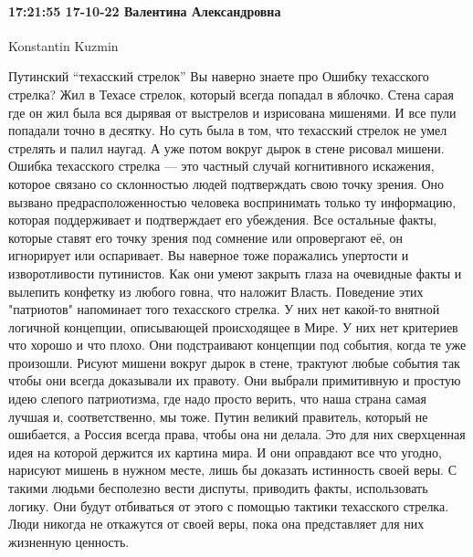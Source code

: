  
 
 
 
 

\paragraph{17:21:55 17-10-22 Валентина Александровна}

Konstantin Kuzmin

Путинский “техасский стрелок”
Вы наверно знаете про Ошибку техасского стрелка?
Жил в Техасе стрелок, который всегда попадал в яблочко. Стена сарая где он жил была вся дырявая от выстрелов и изрисована мишенями. И все пули попадали точно в десятку. Но суть была в том, что техасский стрелок не умел стрелять и палил наугад. А уже потом вокруг дырок в стене рисовал мишени.
Ошибка техасского стрелка — это частный случай когнитивного искажения, которое связано со склонностью людей подтверждать свою точку зрения. Оно вызвано предрасположенностью человека воспринимать только ту информацию, которая поддерживает и подтверждает его убеждения. Все остальные факты, которые ставят его точку зрения под сомнение или опровергают её, он игнорирует или оспаривает.
Вы наверное тоже поражались упертости и изворотливости путинистов. Как они умеют закрыть глаза на очевидные факты и вылепить конфетку из любого говна, что наложит Власть.
Поведение этих "патриотов" напоминает того техасского стрелка. У них нет какой-то внятной логичной концепции, описывающей происходящее в Мире. У них нет критериев что хорошо и что плохо. Они подстраивают концепции под события, когда те уже произошли. Рисуют мишени вокруг дырок в стене, трактуют любые события так чтобы они всегда доказывали их правоту.
Они выбрали примитивную и простую идею слепого патриотизма, где надо просто верить, что наша страна самая лучшая и, соответственно, мы тоже. Путин великий правитель, который не ошибается, а Россия всегда права, чтобы она ни делала. Это для них сверхценная идея на которой держится их картина мира. И они оправдают все что угодно, нарисуют мишень в нужном месте, лишь бы доказать истинность своей веры.
С такими людьми бесполезно вести диспуты, приводить факты, использовать логику. Они будут отбиваться от этого с помощью тактики техасского стрелка.
Люди никогда не откажутся от своей веры, пока она представляет для них жизненную ценность.

